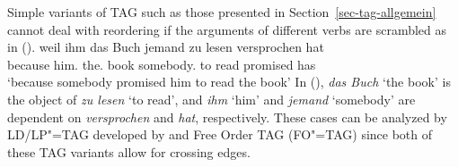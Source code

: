 Simple variants of TAG such as those presented in Section~\ref{sec-tag-allgemein} cannot deal with
reordering if the arguments of different verbs are scrambled as in ().
\ea
\label{ex-weil-ihm-das-Buch-jemand-zu-lesen-versprochen-hat-drei}
\gll weil    ihm das Buch jemand   zu lesen versprochen hat\footnotemark\\
     because him.\dat{} the.\acc{} book somebody.\nom{} to read promised has\\
\glt `because somebody promised him to read the book'
\z
In (), \emph{das Buch} `the book' is the object of \emph{zu lesen} `to read', and \emph{ihm}
`him' and \emph{jemand} `somebody' are dependent on \emph{versprochen} and \emph{hat}, respectively.
These cases can be analyzed by LD/LP"=TAG developed by \citet{Joshi87b} and Free Order TAG
(FO"=TAG) \citep*[]{BJR91a} since both of these TAG variants allow for
crossing edges.


